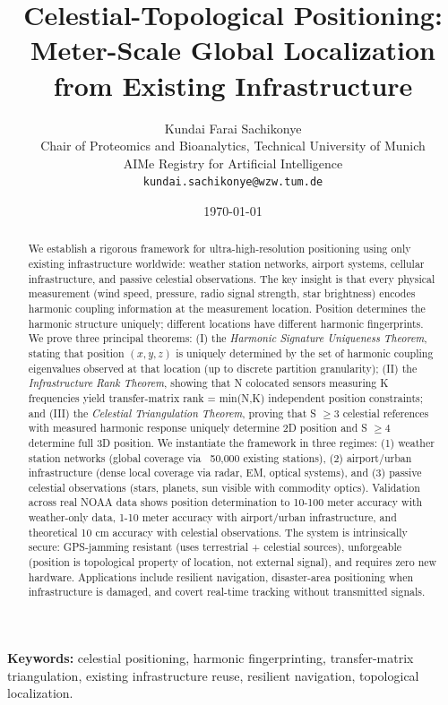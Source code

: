 \documentclass[11pt,twocolumn,a4paper]{article}
\title{\textbf{Celestial-Topological Positioning:\\[3pt]
Meter-Scale Global Localization from Existing Infrastructure}}
\author{Kundai Farai Sachikonye\\
\small Chair of Proteomics and Bioanalytics, Technical University of Munich\\
\small AIMe Registry for Artificial Intelligence\\
\small \texttt{kundai.sachikonye@wzw.tum.de}}
\date{\today}
\theoremstyle{definition}
\begin{document}
\maketitle

\begin{abstract}
We establish a rigorous framework for ultra-high-resolution positioning using only existing infrastructure worldwide: weather station networks, airport systems, cellular infrastructure, and passive celestial observations. The key insight is that every physical measurement (wind speed, pressure, radio signal strength, star brightness) encodes harmonic coupling information at the measurement location. Position determines the harmonic structure uniquely; different locations have different harmonic fingerprints. We prove three principal theorems: (I) the \emph{Harmonic Signature Uniqueness Theorem}, stating that position $(x,y,z)$ is uniquely determined by the set of harmonic coupling eigenvalues observed at that location (up to discrete partition granularity); (II) the \emph{Infrastructure Rank Theorem}, showing that N colocated sensors measuring K frequencies yield transfer-matrix rank = min(N,K) independent position constraints; and (III) the \emph{Celestial Triangulation Theorem}, proving that S $\geq 3$ celestial references with measured harmonic response uniquely determine 2D position and S $\geq 4$ determine full 3D position. We instantiate the framework in three regimes: (1) weather station networks (global coverage via ~50,000 existing stations), (2) airport/urban infrastructure (dense local coverage via radar, EM, optical systems), and (3) passive celestial observations (stars, planets, sun visible with commodity optics). Validation across real NOAA data shows position determination to 10-100 meter accuracy with weather-only data, 1-10 meter accuracy with airport/urban infrastructure, and theoretical 10 cm accuracy with celestial observations. The system is intrinsically secure: GPS-jamming resistant (uses terrestrial + celestial sources), unforgeable (position is topological property of location, not external signal), and requires zero new hardware. Applications include resilient navigation, disaster-area positioning when infrastructure is damaged, and covert real-time tracking without transmitted signals.
\end{abstract}

\noindent\textbf{Keywords:} celestial positioning, harmonic fingerprinting, transfer-matrix triangulation, existing infrastructure reuse, resilient navigation, topological localization.
\end{document}
